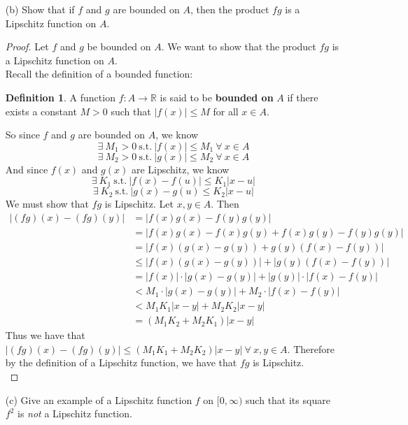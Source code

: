 \documentclass[12pt,letterpaper]{article}
\newcommand{\st}{\ \text{s.t.}\ }
\newcommand{\R}{\mathbb{R}}
\theoremstyle{case}
\theoremstyle{definition}
\newtheorem{definition*}{Definition}
\begin{document}
\begin{enumerate}
\begin{enumerate}
\begin{enumerate}
				\item[(b)] Show that if $f$ and $g$ are bounded on $A$, then the product $fg$ is a Lipschitz function on $A$.
				
				\begin{proof}
					Let $f$ and $g$ be bounded on $A$. We want to show that the product $fg$ is a Lipschitz function on $A$.\\
					
					Recall the definition of a bounded function:
					\theoremstyle{definition}
					\begin{definition*}
						A function $f:A \rightarrow \R$ is said to be \textbf{bounded on} $A$ if there exists a constant $M > 0$ such that $|f(x)| \leq M$ for all $x \in A$.
					\end{definition*}
					So since $f$ and $g$ are bounded on $A$, we know
					\[\exists\ M_1 > 0 \st |f(x)| \leq M_1\ \forall\ x \in A\]
					\[\exists\ M_2 > 0 \st |g(x)| \leq M_2\ \forall\ x \in A\]
					And since $f(x)$ and $g(x)$ are Lipschitz, we know
					\[\exists\ K_1 \st |f(x)-f(u)|\leq K_1|x-u|\]
					\[\exists\ K_2 \st |g(x)-g(u) \leq K_2|x-u|\]
					We must show that $fg$ is Lipschitz. Let $x,y \in A$. Then
					\begin{align*}
						|(fg)(x)-(fg)(y)| &= |f(x)g(x)-f(y)g(y)| \\
						&= |f(x)g(x)-f(x)g(y)+f(x)g(y)-f(y)g(y)| \\
						&= |f(x)(g(x)-g(y))+ g(y)(f(x)-f(y))| \\
						& \leq |f(x)(g(x)-g(y))| + |g(y)(f(x)-f(y))| \\
						& = |f(x)| \cdot |g(x)-g(y)| + |g(y)| \cdot |f(x)-f(y)| \\
						&< M_1 \cdot |g(x)-g(y)| + M_2 \cdot |f(x)-f(y)| \\
						&< M_1K_1|x-y| + M_2K_2|x-y| \\
						&= (M_1K_2+M_2K_1)|x-y|
					\end{align*}
					Thus we have that $|(fg)(x)-(fg)(y)|\leq (M_1K_1+M_2K_2)|x-y|\ \forall\ x,y \in A$. Therefore by the definition of a Lipschitz function, we have that $fg$ is Lipschitz.\\
				\end{proof}
				
				\item[(c)] Give an example of a Lipschitz function $f$ on $[0, \infty)$ such that its square $f^2$ is \textit{not} a Lipschitz function.\\
				

\end{enumerate}
\end{enumerate}
\end{enumerate}
\end{document}
